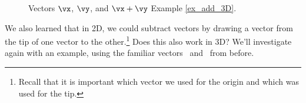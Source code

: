 {\begin{figure}[h!]
\begin{center}
\end{center}
\caption{Vectors $\protect\vx$, $\protect\vy$, and $\protect\vx + \protect\vy$ Example \ref{ex_add_3D}.}
\label{fig:add_3D}
\end{figure}
} %

We also learned that in 2D, we could subtract vectors by drawing a vector from the tip of one vector to the other.\footnote{Recall that it is important which vector we used for the origin and which was used for the tip.} Does this also work in 3D? We'll investigate again with an example, using the familiar vectors \vx\ and \vy\ from before.\\

